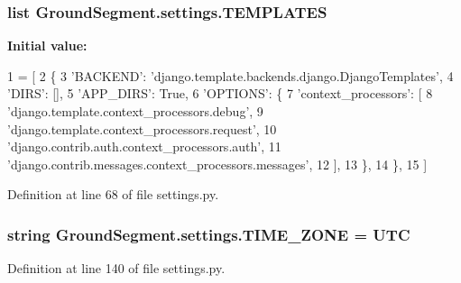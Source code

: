 \subsubsection[{T\+E\+M\+P\+L\+A\+T\+E\+S}]{\setlength{\rightskip}{0pt plus 5cm}list Ground\+Segment.\+settings.\+T\+E\+M\+P\+L\+A\+T\+E\+S}\label{namespace_ground_segment_1_1settings_aef52073a71704189e79714d515ba3de3}
{\bfseries Initial value\+:}
\begin{DoxyCode}
1 = [
2     \{
3         \textcolor{stringliteral}{'BACKEND'}: \textcolor{stringliteral}{'django.template.backends.django.DjangoTemplates'},
4         \textcolor{stringliteral}{'DIRS'}: [],
5         \textcolor{stringliteral}{'APP\_DIRS'}: \textcolor{keyword}{True},
6         \textcolor{stringliteral}{'OPTIONS'}: \{
7             \textcolor{stringliteral}{'context\_processors'}: [
8                 \textcolor{stringliteral}{'django.template.context\_processors.debug'},
9                 \textcolor{stringliteral}{'django.template.context\_processors.request'},
10                 \textcolor{stringliteral}{'django.contrib.auth.context\_processors.auth'},
11                 \textcolor{stringliteral}{'django.contrib.messages.context\_processors.messages'},
12             ],
13         \},
14     \},
15 ]
\end{DoxyCode}


Definition at line 68 of file settings.\+py.

\hypertarget{namespace_ground_segment_1_1settings_a7f5b157199222270cc12a900b1dbb6cc}{}
\subsubsection[{T\+I\+M\+E\+\_\+\+Z\+O\+N\+E}]{\setlength{\rightskip}{0pt plus 5cm}string Ground\+Segment.\+settings.\+T\+I\+M\+E\+\_\+\+Z\+O\+N\+E = \textquotesingle{}U\+T\+C\textquotesingle{}}\label{namespace_ground_segment_1_1settings_a7f5b157199222270cc12a900b1dbb6cc}


Definition at line 140 of file settings.\+py.

\hypertarget{namespace_ground_segment_1_1settings_a58a4a6948688cc8ccf2f31d6bea3a954}{}
